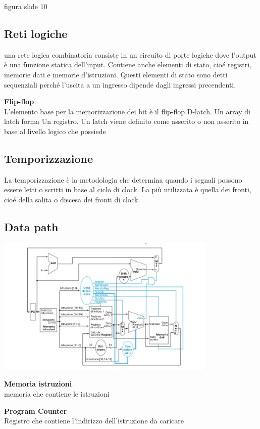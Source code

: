 \documentclass[12pt, a4paper]{article}
\begin{document}
figura slide 10

\subsection{Reti logiche}
una rete logica combinatoria consiste in un circuito di porte logiche dove l'output è una funzione statica dell'input.
Contiene anche elementi di stato, cioé registri, memorie dati e memorie d'istruzioni. Questi elementi di stato sono detti 
sequenziali perché l'uscita a un ingresso dipende dagli ingressi precendenti. 

\textbf{Flip-flop}\\ L'elemento base per la memorizzazione dei bit è il flip-flop D-latch. Un array di latch forma Un
registro. Un latch viene definito come asserito o non asserito in base al livello logico che possiede

\subsection{Temporizzazione}
La temporizzazione è la metodologia che determina quando i segnali possono essere letti o scritti in base al ciclo di clock.
La più utilizzata è quella dei fronti, cioé della salita o discesa dei fronti di clock.

\subsection{Data path}
\begin{center}
  \includegraphics[width=400px]{images/CPU_Structure.jpeg}
\end{center}

\textbf{Memoria istruzioni}\\ memoria che contiene le istruzioni

\textbf{Program Counter}\\Registro che contiene l'indirizzo dell'istruzione da caricare
\end{document}
